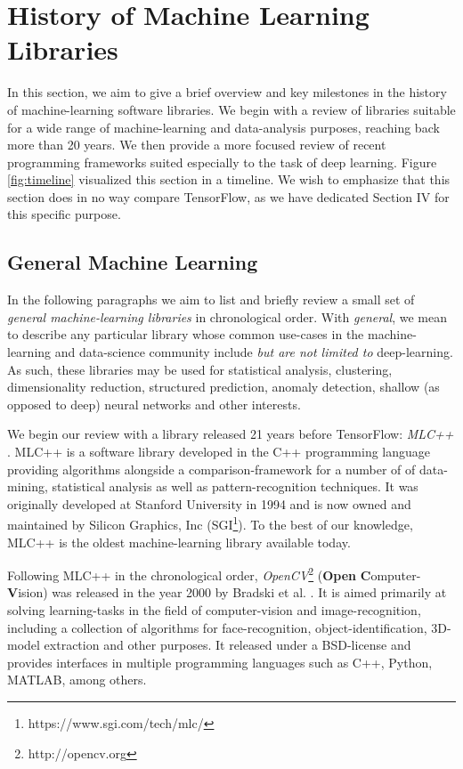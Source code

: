 \section{History of Machine Learning Libraries}

In this section, we aim to give a brief overview and key milestones in the
history of machine-learning software libraries. We begin with a review of
libraries suitable for a wide range of machine-learning and data-analysis
purposes, reaching back more than 20 years. We then provide a more focused
review of recent programming frameworks suited especially to the task of deep
learning. Figure \ref{fig:timeline} visualized this section in a timeline. We
wish to emphasize that this section does in no way compare TensorFlow, as we
have dedicated Section IV for this specific purpose.

\subsection{General Machine Learning}

In the following paragraphs we aim to list and briefly review a small set of
\emph{general machine-learning libraries} in chronological order. With
\emph{general}, we mean to describe any particular library whose common
use-cases in the machine-learning and data-science community include \emph{but
  are not limited to} deep-learning. As such, these libraries may be used for
statistical analysis, clustering, dimensionality reduction, structured
prediction, anomaly detection, shallow (as opposed to deep) neural networks and
other interests.

We begin our review with a library released 21 years before TensorFlow:
\emph{MLC++} \cite{mlcpp}. MLC++ is a software library developed in the C++
programming language providing algorithms alongside a comparison-framework for a
number of of data-mining, statistical analysis as well as pattern-recognition
techniques. It was originally developed at Stanford University in 1994 and is
now owned and maintained by Silicon Graphics, Inc
(SGI\footnote{https://www.sgi.com/tech/mlc/}). To the best of our knowledge,
MLC++ is the oldest machine-learning library available today.

Following MLC++ in the chronological order,
\emph{OpenCV}\footnote{http://opencv.org} (\textbf{Open}
\textbf{C}omputer-\textbf{V}ision) was released in the year 2000 by Bradski et
al. \cite{opencv}. It is aimed primarily at solving learning-tasks in the field
of computer-vision and image-recognition, including a collection of algorithms
for face-recognition, object-identification, 3D-model extraction and other
purposes. It released under a BSD-license and provides interfaces in multiple
programming languages such as C++, Python, MATLAB, among others.

